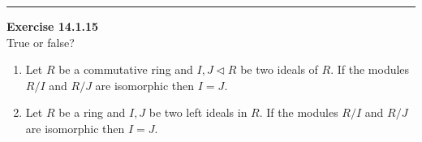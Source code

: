 \documentclass[a4paper, 12pt]{article}
\newenvironment{problem}[2][Exercise]
    { \begin{mdframed}[backgroundcolor=gray!20] \textbf{#1 #2} \\}
    {  \end{mdframed}}
\begin{document}
\noindent\rule{7in}{2.8pt}
\begin{problem}{14.1.15}
True or false?
\begin{enumerate}[(1)]
\item Let \(R\) be a commutative ring and \(I,J\lhd R\) be two ideals of \(R\). If the modules \(R/I\) and \(R/J\) are isomorphic then \(I=J\).
\item Let \(R\) be a ring and \(I,J\) be two left ideals in \(R\). If the modules \(R/I\) and \(R/J\) are isomorphic then \(I=J\).
\end{enumerate}
\end{problem}
\end{document}
